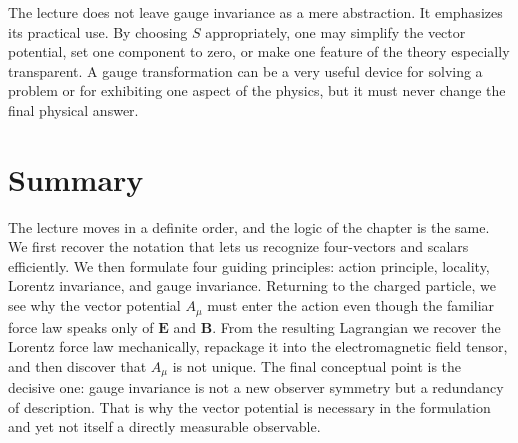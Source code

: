 The lecture does not leave gauge invariance as a mere abstraction. It emphasizes its practical use. By choosing \(S\) appropriately, one may simplify the vector potential, set one component to zero, or make one feature of the theory especially transparent. A gauge transformation can be a very useful device for solving a problem or for exhibiting one aspect of the physics, but it must never change the final physical answer.

\section{Summary}

The lecture moves in a definite order, and the logic of the chapter is the same. We first recover the notation that lets us recognize four-vectors and scalars efficiently. We then formulate four guiding principles: action principle, locality, Lorentz invariance, and gauge invariance. Returning to the charged particle, we see why the vector potential \(A_\mu\) must enter the action even though the familiar force law speaks only of \(\mathbf E\) and \(\mathbf B\). From the resulting Lagrangian we recover the Lorentz force law mechanically, repackage it into the electromagnetic field tensor, and then discover that \(A_\mu\) is not unique. The final conceptual point is the decisive one: gauge invariance is not a new observer symmetry but a redundancy of description. That is why the vector potential is necessary in the formulation and yet not itself a directly measurable observable.